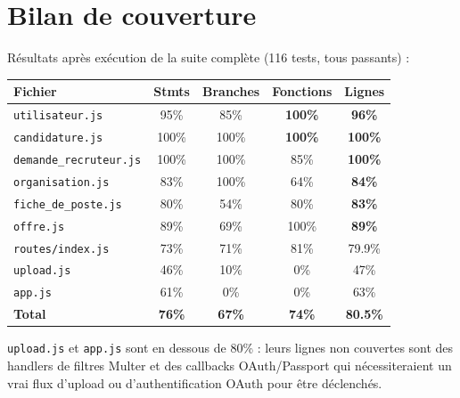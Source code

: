 \documentclass[12pt,a4paper]{article}
\begin{document}
\section{Bilan de couverture}

Résultats après exécution de la suite complète (116 tests, tous passants) :

\vspace{0.5em}
\begin{center}
\begin{tabular}{lcccc}
\toprule
\textbf{Fichier} & \textbf{Stmts} & \textbf{Branches} & \textbf{Fonctions} & \textbf{Lignes} \\
\midrule
\rowcolor{rowgray}
\texttt{utilisateur.js}       & 95\%  & 85\%  & \textcolor{okgreen}{\textbf{100\%}} & \textcolor{okgreen}{\textbf{96\%}}  \\
\texttt{candidature.js}       & 100\% & 100\% & \textcolor{okgreen}{\textbf{100\%}} & \textcolor{okgreen}{\textbf{100\%}} \\
\rowcolor{rowgray}
\texttt{demande\_recruteur.js}& 100\% & 100\% & 85\%  & \textcolor{okgreen}{\textbf{100\%}} \\
\texttt{organisation.js}      & 83\%  & 100\% & 64\%  & \textcolor{okgreen}{\textbf{84\%}}  \\
\rowcolor{rowgray}
\texttt{fiche\_de\_poste.js}  & 80\%  & 54\%  & 80\%  & \textcolor{okgreen}{\textbf{83\%}}  \\
\texttt{offre.js}             & 89\%  & 69\%  & 100\% & \textcolor{okgreen}{\textbf{89\%}}  \\
\rowcolor{rowgray}
\texttt{routes/index.js}      & 73\%  & 71\%  & 81\%  & 79.9\%                              \\
\texttt{upload.js}            & 46\%  & 10\%  & 0\%   & \textcolor{warnred}{47\%}           \\
\rowcolor{rowgray}
\texttt{app.js}               & 61\%  & 0\%   & 0\%   & \textcolor{warnred}{63\%}           \\
\midrule
\textbf{Total} & \textbf{76\%} & \textbf{67\%} & \textbf{74\%} & \textcolor{okgreen}{\textbf{80.5\%}} \\
\bottomrule
\end{tabular}
\end{center}
\vspace{0.5em}

\texttt{upload.js} et \texttt{app.js} sont en dessous de 80\% : leurs lignes non couvertes sont des handlers de filtres Multer et des callbacks OAuth/Passport qui nécessiteraient un vrai flux d'upload ou d'authentification OAuth pour être déclenchés.
\end{document}
